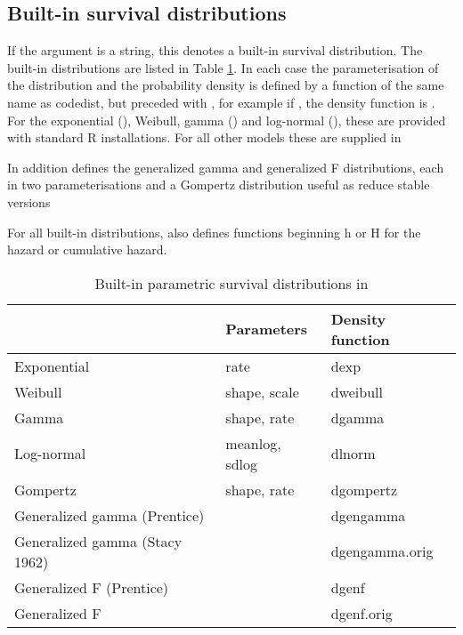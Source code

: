 \documentclass[nojss,nofooter]{jss}\usepackage[]{graphicx}\usepackage[]{color}
\begin{document}
\subsection{Built-in survival distributions}

If the argument  is a string, this denotes a built-in
survival distribution.  The built-in distributions are listed in Table
\ref{tab:dists}.  In each case the parameterisation of the
distribution and the probability density is defined by a function of
the same name as code{dist}, but preceded with , for example
if , the density function is
. For the exponential (), Weibull, gamma
() and log-normal (), these are provided
with standard R installations.  For all other models these are
supplied in 


In addition  
defines the generalized gamma and generalized F distributions, each in two parameterisations
\citet{ccox:taxonomy:hazards}
\citet{prentice:loggamma}
\citet{stacy:gengamma}
\citet{ccox:genf}
\citet{prentice:genf}
and a Gompertz distribution
useful as reduce
stable versions

For all built-in distributions,  also defines functions beginning h or H for the hazard or cumulative hazard. 

\begin{table}
  \begin{tabular}{lll}
\hline
    &  Parameters &  Density function \\
\hline
    Exponential & rate             & dexp   \\
    Weibull     & shape, scale     & dweibull \\
    Gamma       & shape, rate      & dgamma\\
    Log-normal  & meanlog, sdlog   & dlnorm\\
    Gompertz    & shape, rate      & dgompertz \\
    Generalized gamma (Prentice)   & & dgengamma \\
    Generalized gamma (Stacy 1962) & & dgengamma.orig \\
    Generalized F     (Prentice)   & & dgenf \\
    Generalized F                  & & dgenf.orig \\
\hline
  \end{tabular}
  \caption{Built-in parametric survival distributions in }
  \label{tab:dists}
\end{table}
\end{document}
